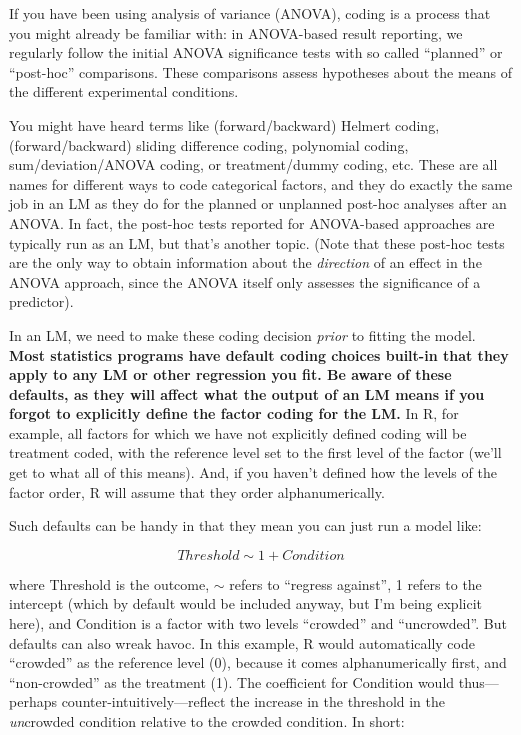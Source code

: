 \documentclass[
]{article}
\begin{document}
If you have been using analysis of variance (ANOVA), coding is a process
that you might already be familiar with: in ANOVA-based result
reporting, we regularly follow the initial ANOVA significance tests with
so called ``planned'' or ``post-hoc'' comparisons. These comparisons
assess hypotheses about the means of the different experimental
conditions.

You might have heard terms like (forward/backward) Helmert coding,
(forward/backward) sliding difference coding, polynomial coding,
sum/deviation/ANOVA coding, or treatment/dummy coding, etc. These are
all names for different ways to code categorical factors, and they do
exactly the same job in an LM as they do for the planned or unplanned
post-hoc analyses after an ANOVA. In fact, the post-hoc tests reported
for ANOVA-based approaches are typically run as an LM, but that's
another topic. (Note that these post-hoc tests are the only way to
obtain information about the \emph{direction} of an effect in the ANOVA
approach, since the ANOVA itself only assesses the significance of a
predictor).

In an LM, we need to make these coding decision \emph{prior} to fitting
the model. \textbf{Most statistics programs have default coding choices
built-in that they apply to any LM or other regression you fit. Be aware
of these defaults, as they will affect what the output of an LM means if
you forgot to explicitly define the factor coding for the LM.} In R, for
example, all factors for which we have not explicitly defined coding
will be treatment coded, with the reference level set to the first level
of the factor (we'll get to what all of this means). And, if you haven't
defined how the levels of the factor order, R will assume that they
order alphanumerically.

Such defaults can be handy in that they mean you can just run a model
like:

\[ Threshold \sim 1 + Condition \]

where Threshold is the outcome, \(\sim\) refers to ``regress against'',
1 refers to the intercept (which by default would be included anyway,
but I'm being explicit here), and Condition is a factor with two levels
``crowded'' and ``uncrowded''. But defaults can also wreak havoc. In
this example, R would automatically code ``crowded'' as the reference
level (0), because it comes alphanumerically first, and ``non-crowded''
as the treatment (1). The coefficient for Condition would thus---perhaps
counter-intuitively---reflect the increase in the threshold in the
\emph{un}crowded condition relative to the crowded condition. In short:
\end{document}
